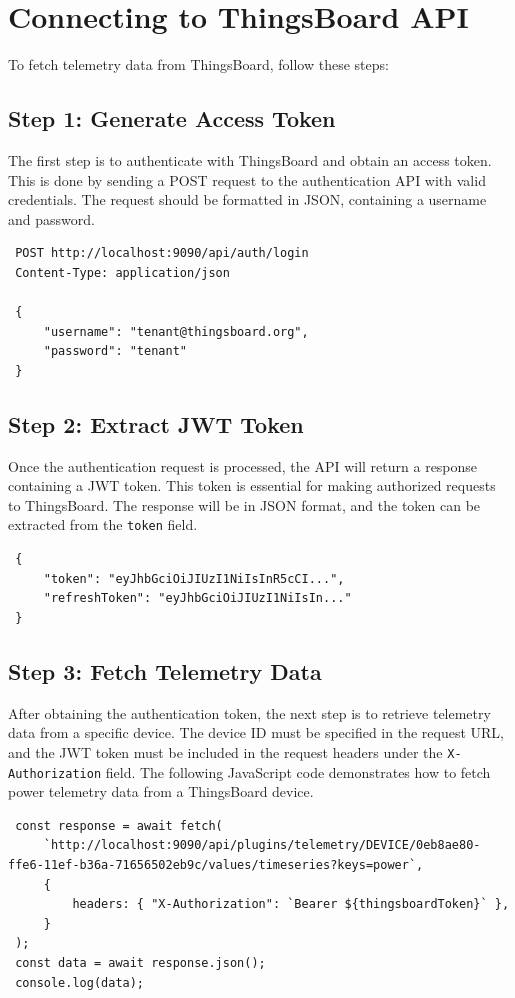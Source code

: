 \documentclass[a4paper,12pt]{report}
\begin{document}
 \section{Connecting to ThingsBoard API}
 
 To fetch telemetry data from ThingsBoard, follow these steps:
 
 \subsection{Step 1: Generate Access Token}
 The first step is to authenticate with ThingsBoard and obtain an access token. This is done by sending a POST request to the authentication API with valid credentials. The request should be formatted in JSON, containing a username and password.
 
 \begin{lstlisting}
 POST http://localhost:9090/api/auth/login
 Content-Type: application/json
 
 {
     "username": "tenant@thingsboard.org",
     "password": "tenant"
 }
 \end{lstlisting}
 
 \subsection{Step 2: Extract JWT Token}
 Once the authentication request is processed, the API will return a response containing a JWT token. This token is essential for making authorized requests to ThingsBoard. The response will be in JSON format, and the token can be extracted from the \texttt{token} field.
 
 \begin{lstlisting}
 {
     "token": "eyJhbGciOiJIUzI1NiIsInR5cCI...",
     "refreshToken": "eyJhbGciOiJIUzI1NiIsIn..."
 }
 \end{lstlisting}
 
 \subsection{Step 3: Fetch Telemetry Data}
 After obtaining the authentication token, the next step is to retrieve telemetry data from a specific device. The device ID must be specified in the request URL, and the JWT token must be included in the request headers under the \texttt{X-Authorization} field. The following JavaScript code demonstrates how to fetch power telemetry data from a ThingsBoard device.
 
 \begin{lstlisting}
 const response = await fetch( 
     `http://localhost:9090/api/plugins/telemetry/DEVICE/0eb8ae80-ffe6-11ef-b36a-71656502eb9c/values/timeseries?keys=power`,
     {
         headers: { "X-Authorization": `Bearer ${thingsboardToken}` },
     }
 );
 const data = await response.json();
 console.log(data);
 \end{lstlisting}
 
\end{document}

